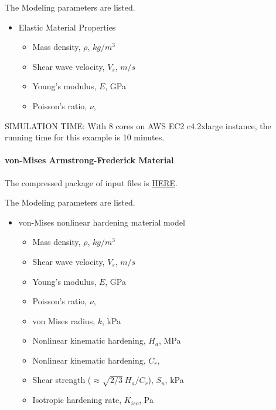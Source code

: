The Modeling parameters are listed.
\begin{itemize}
  \item Elastic Material Properties 
  \begin{itemize}
    \item Mass density, $\rho$, \enspace {} $kg/m^3$
    \item Shear wave velocity, $V_s$, \enspace {} $m/s$
    \item Young's modulus, $E$, \enspace {} GPa
    \item Poisson's ratio, $\nu$, \enspace {}
  \end{itemize}
\end{itemize}


SIMULATION TIME: With 8 cores on AWS EC2 c4.2xlarge instance, the running time for this example is 10 minutes.

\paragraph{von-Mises Armstrong-Frederick Material}
The compressed package of input files is  
\href{http://sokocalo.engr.ucdavis.edu/~jeremic/lecture_notes_online_material/_Chapter_Short_Course_Examples/nonlinear_analysis_steps/soil-structure/vonMisesArmstrongFrederick/_all_files_packaged_for_vonMisesArmstrongFrederick.tar.gz}{HERE}. 


The Modeling parameters are listed.
\begin{itemize}
  \item von-Mises nonlinear hardening material model 
  \begin{itemize}
    \item Mass density, $\rho$, \enspace {} $kg/m^3$
    \item Shear wave velocity, $V_s$, \enspace {} $m/s$
    \item Young's modulus, $E$, \enspace {} GPa
    \item Poisson's ratio, $\nu$, \enspace {}
    \item von Mises radius, $k$, \enspace {} kPa
    \item Nonlinear kinematic hardening, $H_a$, \enspace {} MPa
    \item Nonlinear kinematic hardening, $C_r$, \enspace {}
    \item Shear strength ($\approx \sqrt{2/3}\ {H_a/C_r} $), $S_u$, \enspace {} kPa
    \item Isotropic hardening rate, $K_{iso}$, \enspace {} Pa
  \end{itemize}
\end{itemize}


